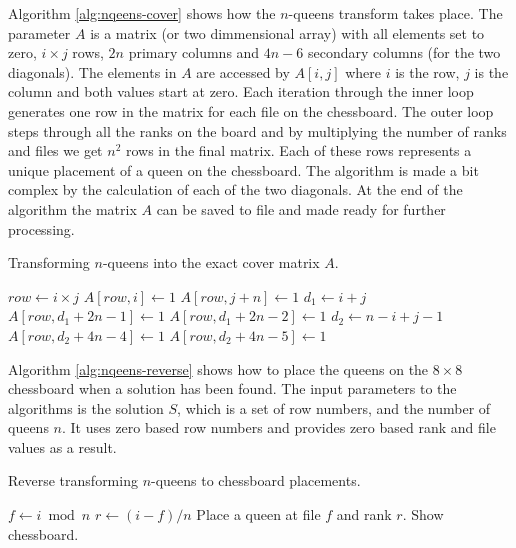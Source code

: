 Algorithm \ref{alg:nqeens-cover} shows how the $n$-queens transform takes place.
The parameter $A$ is a matrix (or two dimmensional array) with all elements set to zero, $i \times j$ rows, $2n$ primary columns and $4n - 6$ secondary columns (for the two diagonals).
The elements in $A$ are accessed by $A[i,j]$ where $i$ is the row, $j$ is the column and both values start at zero.
Each iteration through the inner loop generates one row in the matrix for each file on the chessboard.
The outer loop steps through all the ranks on the board and by multiplying the number of ranks and files we get $n^2$ rows in the final matrix.
Each of these rows represents a unique placement of a queen on the chessboard.
The algorithm is made a bit complex by the calculation of each of the two diagonals.
At the end of the algorithm the matrix $A$ can be saved to file and made ready for further processing.
\begin{algorithm}[H]
	\caption{Transforming $n$-queens into the exact cover matrix $A$.}
	\label{alg:nqeens-cover}
	\begin{distribalgo}[1]
					\STATE $row \leftarrow i \times j$
					\STATE $A[row,i] \leftarrow 1$  
					\STATE $A[row,j+n] \leftarrow 1$  
					\STATE $d_1 \leftarrow i + j$  
							\STATE $A[row,d_1 + 2n - 1] \leftarrow 1$
						\ELSE
							\STATE $A[row,d_1 + 2n - 2] \leftarrow 1$
						\ENDIF
					\ENDIF
					\STATE $d_2 \leftarrow n - i + j - 1$  
							\STATE $A[row,d_2 + 4n - 4] \leftarrow 1$
						\ELSE
							\STATE $A[row,d_2 + 4n - 5] \leftarrow 1$
						\ENDIF
					\ENDIF
				\ENDFOR
			\ENDFOR
		\ENDPROC
	\end{distribalgo}
\end{algorithm}
\noindent Algorithm \ref{alg:nqeens-reverse} shows how to place the queens on the $8 \times 8$ chessboard when a solution has been found.
The input parameters to the algorithms is the solution $S$, which is a set of row numbers, and the number of queens $n$.
It uses zero based row numbers and provides zero based rank and file values as a result.
\begin{algorithm}[H]
	\caption{Reverse transforming $n$-queens to chessboard placements.}
	\label{alg:nqeens-reverse}
	\begin{distribalgo}[1]
				\STATE $f \leftarrow i \bmod n$
				\STATE $r \leftarrow (i - f) / n$
				\STATE Place a queen at file $f$ and rank $r$.
			\ENDFOR
			\STATE Show chessboard.
		\ENDPROC
	\end{distribalgo}
\end{algorithm}

